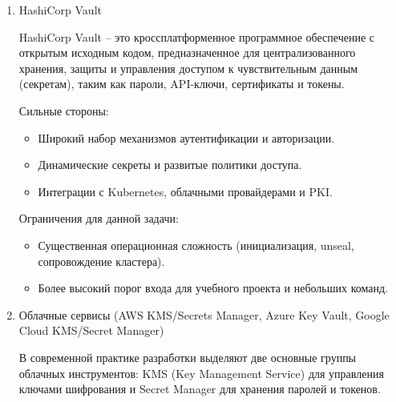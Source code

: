 \documentclass[14pt, a4paper]{extarticle}
\begin{document}
	\begin{enumerate}                                        

	\item HashiCorp Vault
	
	HashiCorp Vault -- это кроссплатформенное программное обеспечение с открытым исходным кодом, предназначенное для централизованного хранения, защиты и управления доступом к чувствительным данным (секретам), таким как пароли, API-ключи, сертификаты и токены.
	
	Сильные стороны:
	
	\begin{itemize}
	\item Широкий набор механизмов аутентификации и авторизации.
	\item Динамические секреты и развитые политики доступа.
	\item Интеграции с Kubernetes, облачными провайдерами и PKI.
	\end{itemize}
	
	Ограничения для данной задачи:
	
	\begin{itemize}
	\item Существенная операционная сложность (инициализация, unseal, сопровождение кластера).
	\item Более высокий порог входа для учебного проекта и небольших команд.
	\end{itemize}
		
	\item Облачные сервисы (AWS KMS/Secrets Manager, Azure Key Vault, Google Cloud KMS/Secret Manager)
	
	В современной практике разработки выделяют две основные группы облачных инструментов: KMS (Key Management Service) для управления ключами шифрования и Secret Manager для хранения паролей и токенов.
	

\end{enumerate}
\end{document}
